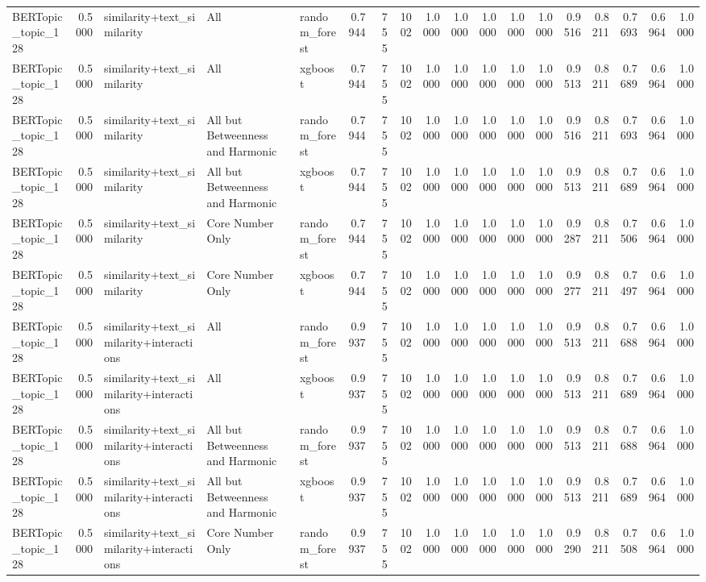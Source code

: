\begin{tabular}{lrlllrrrrrrrrrrrrr}
BERTopic_topic_128 & 0.5000 & similarity+text_similarity & All & random_forest & 0.7944 & 755 & 1002 & 1.0000 & 1.0000 & 1.0000 & 1.0000 & 1.0000 & 0.9516 & 0.8211 & 0.7693 & 0.6964 & 1.0000 \\
BERTopic_topic_128 & 0.5000 & similarity+text_similarity & All & xgboost & 0.7944 & 755 & 1002 & 1.0000 & 1.0000 & 1.0000 & 1.0000 & 1.0000 & 0.9513 & 0.8211 & 0.7689 & 0.6964 & 1.0000 \\
BERTopic_topic_128 & 0.5000 & similarity+text_similarity & All but Betweenness and Harmonic & random_forest & 0.7944 & 755 & 1002 & 1.0000 & 1.0000 & 1.0000 & 1.0000 & 1.0000 & 0.9516 & 0.8211 & 0.7693 & 0.6964 & 1.0000 \\
BERTopic_topic_128 & 0.5000 & similarity+text_similarity & All but Betweenness and Harmonic & xgboost & 0.7944 & 755 & 1002 & 1.0000 & 1.0000 & 1.0000 & 1.0000 & 1.0000 & 0.9513 & 0.8211 & 0.7689 & 0.6964 & 1.0000 \\
BERTopic_topic_128 & 0.5000 & similarity+text_similarity & Core Number Only & random_forest & 0.7944 & 755 & 1002 & 1.0000 & 1.0000 & 1.0000 & 1.0000 & 1.0000 & 0.9287 & 0.8211 & 0.7506 & 0.6964 & 1.0000 \\
BERTopic_topic_128 & 0.5000 & similarity+text_similarity & Core Number Only & xgboost & 0.7944 & 755 & 1002 & 1.0000 & 1.0000 & 1.0000 & 1.0000 & 1.0000 & 0.9277 & 0.8211 & 0.7497 & 0.6964 & 1.0000 \\
BERTopic_topic_128 & 0.5000 & similarity+text_similarity+interactions & All & random_forest & 0.9937 & 755 & 1002 & 1.0000 & 1.0000 & 1.0000 & 1.0000 & 1.0000 & 0.9513 & 0.8211 & 0.7688 & 0.6964 & 1.0000 \\
BERTopic_topic_128 & 0.5000 & similarity+text_similarity+interactions & All & xgboost & 0.9937 & 755 & 1002 & 1.0000 & 1.0000 & 1.0000 & 1.0000 & 1.0000 & 0.9513 & 0.8211 & 0.7689 & 0.6964 & 1.0000 \\
BERTopic_topic_128 & 0.5000 & similarity+text_similarity+interactions & All but Betweenness and Harmonic & random_forest & 0.9937 & 755 & 1002 & 1.0000 & 1.0000 & 1.0000 & 1.0000 & 1.0000 & 0.9513 & 0.8211 & 0.7688 & 0.6964 & 1.0000 \\
BERTopic_topic_128 & 0.5000 & similarity+text_similarity+interactions & All but Betweenness and Harmonic & xgboost & 0.9937 & 755 & 1002 & 1.0000 & 1.0000 & 1.0000 & 1.0000 & 1.0000 & 0.9513 & 0.8211 & 0.7689 & 0.6964 & 1.0000 \\
BERTopic_topic_128 & 0.5000 & similarity+text_similarity+interactions & Core Number Only & random_forest & 0.9937 & 755 & 1002 & 1.0000 & 1.0000 & 1.0000 & 1.0000 & 1.0000 & 0.9290 & 0.8211 & 0.7508 & 0.6964 & 1.0000 \\

\end{tabular}
